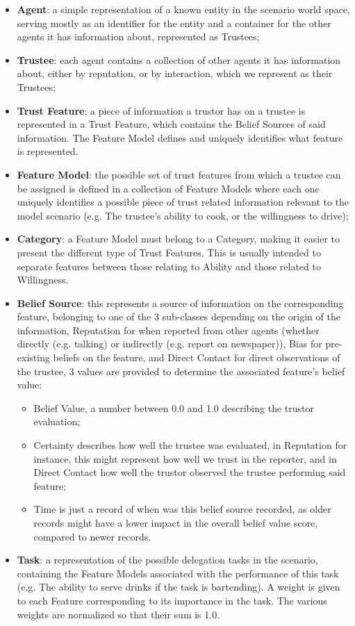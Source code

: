 \begin{itemize}
    \item \textbf{Agent}: a simple representation of a known entity in the scenario world space, serving mostly as an identifier for the entity and a container for the other agents it has information about, represented as Trustees;
    \item \textbf{Trustee}: each agent contains a collection of other agents it has information about, either by reputation, or by interaction, which we represent as their Trustees;
    \item \textbf{Trust Feature}: a piece of information a trustor has on a trustee is represented in a Trust Feature, which contains the Belief Sources of said information. The Feature Model defines and uniquely identifies what feature is represented.
    \item \textbf{Feature Model}: the possible set of trust features from which a trustee can be assigned is defined in a collection of Feature Models where each one uniquely identifies a possible piece of trust related information relevant to the model scenario (e.g. The trustee's ability to cook, or the willingness to drive);
    \item \textbf{Category}: a Feature Model must belong to a Category, making it easier to  present the different type of Trust Features. This is usually intended to separate features between those relating to Ability and those related to Willingness.
    \item \textbf{Belief Source}: this represents a source of information on the corresponding feature, belonging to one of the 3 sub-classes depending on the origin of the information, Reputation for when reported from other agents (whether directly (e.g. talking) or indirectly (e.g. report on newspaper)), Bias for pre-existing beliefs on the feature, and Direct Contact for direct observations of the trustee, 3 values are provided to determine the associated feature's belief value: 
        \begin{itemize}
            \item Belief Value, a number between 0.0 and 1.0 describing the trustor evaluation;
            \item Certainty describes how well the trustee was evaluated, in Reputation for instance, this might represent how well we trust in the reporter, and in Direct Contact how well the trustor observed the trustee performing said feature;
            \item Time is just a record of when was this belief source recorded, as older records might have a lower impact in the overall belief value score, compared to newer records.
        \end{itemize} 
    \item \textbf{Task}: a representation of the possible delegation tasks in the scenario, containing the Feature Models associated with the performance of this task (e.g. The ability to serve drinks if the task is bartending). A weight is given to each Feature corresponding to its importance in the task. The various weights are normalized so that their sum is 1.0.
\end{itemize} 

